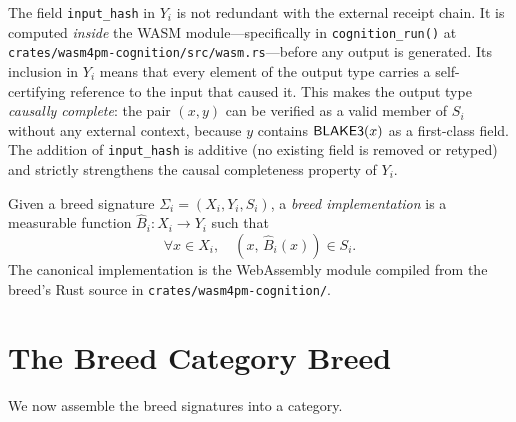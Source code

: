\begin{remark}
The field \texttt{input\_hash} in $Y_i$ is not redundant with the external receipt
chain.  It is computed \emph{inside} the WASM module—specifically in
\texttt{cognition\_run()} at \texttt{crates/wasm4pm-cognition/src/wasm.rs}—before
any output is generated.  Its inclusion in $Y_i$ means that every element of the
output type carries a self-certifying reference to the input that caused it.  This
makes the output type \emph{causally complete}: the pair $(x, y)$ can be verified
as a valid member of $S_i$ without any external context, because $y$ contains
$\mathsf{BLAKE3}(x)$ as a first-class field.  The addition of \texttt{input\_hash} is
additive (no existing field is removed or retyped) and strictly strengthens the
causal completeness property of $Y_i$.
\end{remark}

\begin{definition}
\label{def:breed-implementation}
Given a breed signature $\Sigma_i = (X_i, Y_i, S_i)$, a \emph{breed
implementation} is a measurable function $\hat{B}_i : X_i \to Y_i$ such that
\[
  \forall x \in X_i,\quad (x,\, \hat{B}_i(x)) \in S_i.
\]
The canonical implementation is the WebAssembly module compiled from the breed's
Rust source in \texttt{crates/wasm4pm-cognition/}.
\end{definition}

\section{The Breed Category \texorpdfstring{$\mathbf{Breed}$}{Breed}}
\label{sec:breed-category}

We now assemble the breed signatures into a category.

